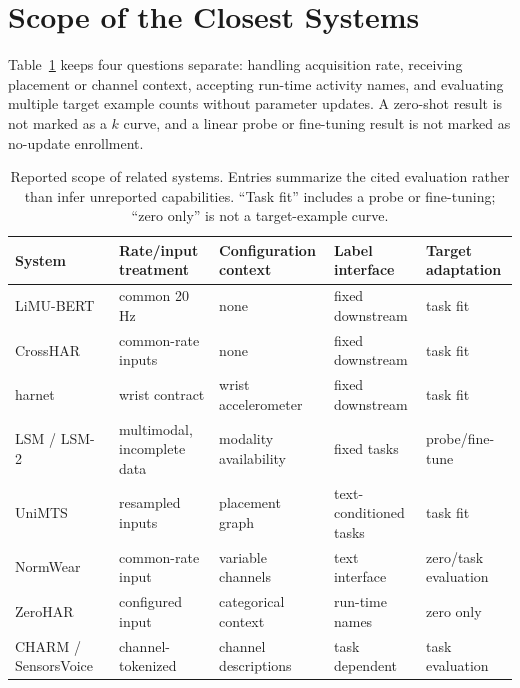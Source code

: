 \appendix

\section{Scope of the Closest Systems}
\label{app:entailment}

Table~\ref{tab:coverage} keeps four questions separate: handling acquisition rate, receiving
placement or channel context, accepting run-time activity names, and evaluating multiple target
example counts without parameter updates. A zero-shot result is not marked as a $k$ curve, and a
linear probe or fine-tuning result is not marked as no-update enrollment.

\begin{table}[t]
  \centering
  \caption{Reported scope of related systems. Entries summarize the cited evaluation rather than
  infer unreported capabilities. ``Task fit'' includes a probe or fine-tuning; ``zero only'' is not
  a target-example curve.}
  \label{tab:coverage}
  \scriptsize
  \setlength{\tabcolsep}{3.5pt}
  \begin{tabularx}{\textwidth}{@{}l
      >{\raggedright\arraybackslash}X
      >{\raggedright\arraybackslash}X
      >{\raggedright\arraybackslash}X
      >{\raggedright\arraybackslash}X@{}}
    \toprule
    System & Rate/input treatment & Configuration context & Label interface & Target adaptation \\
    \midrule
    LiMU-BERT~\cite{limubert} & common 20\,Hz & none & fixed downstream & task fit \\
    CrossHAR~\cite{crosshar} & common-rate inputs & none & fixed downstream & task fit \\
    harnet~\cite{sslwearables} & wrist contract & wrist accelerometer & fixed downstream & task fit \\
    LSM / LSM-2~\cite{lsm1,lsm2} & multimodal, incomplete data & modality availability & fixed tasks & probe/fine-tune \\
    UniMTS~\cite{unimts} & resampled inputs & placement graph & text-conditioned tasks & task fit \\
    NormWear~\cite{normwear} & common-rate input & variable channels & text interface & zero/task evaluation \\
    ZeroHAR~\cite{zerohar} & configured input & categorical context & run-time names & zero only \\
    CHARM / SensorsVoice~\cite{charm,sensorsvoice} & channel-tokenized & channel descriptions & task dependent & task evaluation \\

\end{tabularx}
\end{table}
